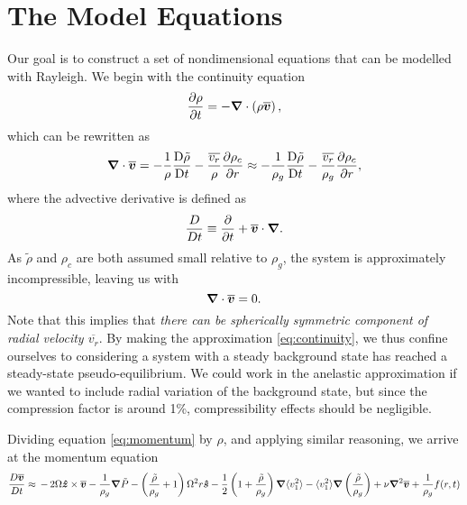 \section{The Model Equations}
Our goal is to construct a set of nondimensional equations that can be modelled with Rayleigh.  We begin with the continuity equation
\begin{equation}
\frac{\partial \rho}{\partial t} = -\boldsymbol{\nabla}\cdot\left(\rho\overline{\boldsymbol{v}}\right),
\end{equation}
which can be rewritten as
\begin{equation}
\boldsymbol{\nabla}\cdot\overline{\boldsymbol{v}} =-\frac{1}{\rho}\frac{\mathrm{D}\tilde{\rho}}{\mathrm{D}t}-\frac{\overline{v_r}}{\rho}\frac{\partial \rho_c}{\partial r} \approx -\frac{1}{\rho_g}\frac{\mathrm{D}\tilde{\rho}}{\mathrm{D}t}-\frac{\overline{v_r}}{\rho_g}\frac{\partial \rho_c}{\partial r},
\end{equation}
where the advective derivative is defined as
\begin{equation}
\frac{D}{Dt}\equiv\frac{\partial}{\partial t} + \overline{\boldsymbol{v}}\cdot\boldsymbol{\nabla}.
\end{equation}
As $\tilde{\rho}$ and $\rho_c$ are both assumed small relative to $\rho_g$, the system is approximately incompressible, leaving us with
\begin{equation}
\label{eq:continuity}
\boldsymbol{\nabla}\cdot\overline{\boldsymbol{v}} = 0.
\end{equation}
Note that this implies that {\em there can be spherically symmetric component of radial velocity $\overline{v_r}$}.  By making the approximation \ref{eq:continuity}, we thus confine ourselves to considering a system with a steady background state has reached a steady-state pseudo-equilibrium.   We could work in the anelastic approximation if we wanted to include radial variation of the background state, but since the compression factor is around 1\%,  compressibility effects should be negligible.

Dividing equation \ref{eq:momentum} by $\rho$, and applying similar reasoning, we arrive at the momentum equation
\begin{equation}
\label{eq:momnew}
\frac{ D \vvecbar }{D t}   \approx  
\,-\, 2\Omega\boldsymbol{\hat{z}}\times\vvecbar 
-\frac{1}{\rho_g}\boldsymbol{\nabla}\tilde{P}  %
-\left(\frac{\tilde{\rho}}{\rho_g}+1\right)\Omega^2r\boldsymbol{\hat{s}}
						        - \frac{1}{2}\left( 1 + \frac{\tilde{\rho}}{\rho_g}\right)\boldsymbol{\nabla}\langle v_1^2\rangle
							- \langle v_1^2\rangle\boldsymbol{\nabla}\left(\frac{\tilde{\rho}}{\rho_g}\right)
+ \nu\boldsymbol{\nabla}^2\vvecbar
+\frac{1}{\rho_g}f(r,t)
\end{equation}

